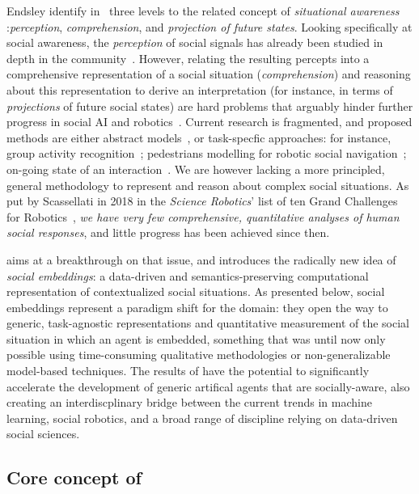 Endsley identify in~\cite{endsley1995theory} three levels to the related concept
of \textit{situational awareness} :\emph{perception}, \emph{comprehension}, and
\emph{projection of future states}. Looking specifically at social awareness,
the \emph{perception} of social signals has already been studied in depth in the
community~\cite{pantic2011social,vinciarelli2009social}.  However, relating the
resulting percepts into a comprehensive representation of a social situation
(\emph{comprehension}) and reasoning about this representation to derive an
interpretation (for instance, in terms of \emph{projections} of future social
states) are hard problems that arguably hinder further progress in social AI and
robotics~\cite{yang2018grand}. Current research is fragmented, and proposed
methods are either abstract models~\cite{gordon2016commonsense}, or task-specfic
approaches: for instance, group activity
recognition~\cite{shu2017cern,wu2019learning}; pedestrians modelling for robotic
social navigation~\cite{alahi2016social}; on-going state of an
interaction~\cite{garcía2020explainable}. We are however lacking a more
principled, general methodology to represent and reason about complex social
situations. As put by Scassellati in 2018 in the \emph{Science Robotics}' list of
ten Grand Challenges for Robotics~\cite{yang2018grand}, \emph{we have very few
comprehensive, quantitative analyses of human social responses}, and little
progress has been achieved since then.

\project aims at a breakthrough on that issue, and introduces the radically new
idea of \emph{social embeddings}: a data-driven and semantics-preserving
computational representation of contextualized social situations.  As presented
below, social embeddings represent a paradigm shift for the domain: they open
the way to generic, task-agnostic representations and quantitative measurement
of the social situation in which an agent is embedded, something that was until
now only possible using time-consuming qualitative methodologies or
non-generalizable model-based techniques.  The results of \project have the
potential to significantly accelerate the development of generic artifical
agents that are socially-aware, also creating an interdiscplinary bridge between
the current trends in machine learning, social robotics, and a broad range of discipline relying
on data-driven social sciences.


\subsection{Core concept of \project}

